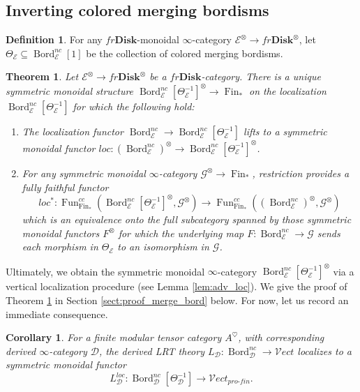 \documentclass[reqno]{amsart}
\newtheorem{theorem}[lemma]{Theorem}
\newtheorem{corollary}[lemma]{Corollary}
\theoremstyle{definition}
\newtheorem{definition}[lemma]{Definition}
\newcommand{\msc}[1]{\mathscr{#1}}
\newcommand{\ot}{\otimes}
\newcommand{\Vect}{\msc{V}\!ect}
\newcommand{\Disk}{\mathbf{Disk}}
\newcommand{\pf}{pro\text{-}fin}
\DeclareMathOperator{\Fun}{Fun}
\DeclareMathOperator{\Fin}{Fin}
\DeclareMathOperator{\Bord}{Bord}
\renewcommand{\1}{\mathbf{1}}
\begin{document}
\subsection{Inverting colored merging bordisms}

\begin{definition}
For any $fr\Disk$-monoidal $\infty$-category $\msc{E}^{\ot}\to fr\Disk^{\ot}$, let $\Theta_{\msc{E}}\subseteq \Bord^{nc}_{\msc{E}}[1]$ be the collection of colored merging bordisms.
\end{definition}

\begin{theorem}\label{thm:merge_loc}
Let $\msc{E}^{\ot}\to fr\Disk^{\ot}$ be a $fr\Disk$-category. There is a unique symmetric monoidal structure $\Bord_{\msc{E}}^{nc}[\Theta^{-1}_{\msc{E}}]^{\ot}\to \Fin_{\ast}$ on the localization $\Bord_{\msc{E}}^{nc}[\Theta^{-1}_{\msc{E}}]$ for which the following hold:
\begin{enumerate}
\item The localization functor $\Bord_{\msc{E}}^{nc}\to \Bord_{\msc{E}}^{nc}[\Theta^{-1}_{\msc{E}}]$ lifts to a symmetric monoidal functor $loc:(\Bord_{\msc{E}}^{nc})^{\ot}\to \Bord_{\msc{E}}^{nc}[\Theta^{-1}_{\msc{E}}]^{\ot}$.\vspace{1mm}
\item For any symmetric monoidal $\infty$-category $\msc{G}^{\ot}\to \Fin_{\ast}$, restriction provides a fully faithful functor
\[
loc^{\ast}:\Fun_{\Fin_{\ast}}^{cc}(\Bord_{\msc{E}}^{nc}[\Theta^{-1}_{\msc{E}}]^{\ot},\msc{G}^{\ot})\to \Fun_{\Fin_{\ast}}^{cc}((\Bord_{\msc{E}}^{nc})^{\ot},\msc{G}^{\ot})
\]
which is an equivalence onto the full subcategory spanned by those symmetric monoidal functors $F^{\ot}$ for which the underlying map $F:\Bord_{\msc{E}}^{nc}\to \msc{G}$ sends each morphism in $\Theta_{\msc{E}}$ to an isomorphism in $\msc{G}$.
\end{enumerate}
\end{theorem}

Ultimately, we obtain the symmetric monoidal $\infty$-category $\Bord_{\msc{E}}^{nc}[\Theta^{-1}_{\msc{E}}]^{\ot}$ via a vertical localization procedure (see Lemma \ref{lem:adv_loc}). We give the proof of Theorem \ref{thm:merge_loc} in Section \ref{sect:proof_merge_bord} below.  For now, let us record an immediate consequence.

\begin{corollary}\label{cor:der_lrt_skeins}
For a finite modular tensor category $A^{\heartsuit}$, with corresponding derived $\infty$-category $\msc{D}$, the derived LRT theory $L_{\msc{D}}:\Bord_{\msc{D}}^{nc}\to \Vect$ localizes to a symmetric monoidal functor
\[
L^{loc}_{\msc{D}}:\Bord_{\msc{D}}^{nc}[\Theta^{-1}_{\msc{D}}]\to \Vect_{\pf}.
\]
\end{corollary}
\end{document}
